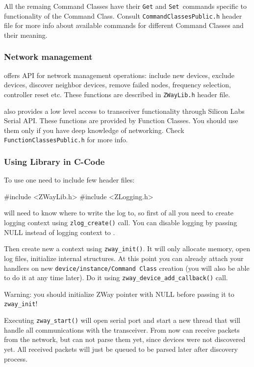 All the remaing Command Classes have their \texttt{Get} and \texttt{Set }commands 
specific to functionality of the Command Class. Consult 
\texttt{CommandClassesPublic.h} header file for more info about available commands 
for different Command Classes and their meaning.

\subsubsection{Network management}

\zway offers API for network management operations: include new devices, exclude devices, 
discover neighbor devices, remove failed nodes, frequency selection, controller reset etc. 
These functions are described in \texttt{ZWayLib.h} header file.

\zway also provides a low level access to \zwave transceiver functionality through Silicon 
Labs Serial API. These functions are provided by Function Classes. You should use 
them only if you have deep knowledge of \zwave networking. Check 
\texttt{FunctionClassesPublic.h} for more info.

\subsubsection{Using \zway Library in C-Code}

To use \zway one need to include few header files:
\begin{listingverbatim}
#include <ZWayLib.h>
#include <ZLogging.h>
\end{listingverbatim}

\zway will need to know where to write the log to, so first of all you need to create 
logging context using \texttt{zlog\_create()} call. You can disable logging by passing NULL 
instead of logging context to \zway.

Then create new a \zway context using \texttt{zway\_init()}. It will only allocate memory, 
open log files, initialize internal structures. At this point you can already attach your 
handlers on new \texttt{device/instance/Command Class} creation (you will also be able 
to do it at any time later). Do it using \texttt{zway\_device\_add\_callback()} call. 

Warning: you should initialize ZWay pointer with NULL before passing it to \texttt{zway\_init}!

Executing \texttt{zway\_start()} will open serial port and start a new thread that 
will handle all communications with the transceiver. From now \zway can receive packets 
from the network, but can not parse them yet, since devices were not discovered yet. 
All received packets will just be queued to be parsed later after discovery process.

